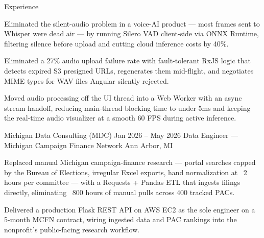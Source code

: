 \documentclass[
	11pt
]{../../../template}
\begin{document}
\begin{rSection}{E}{xperience}
\begin{rSectionEntry}
			\item Eliminated the silent-audio problem in a voice-AI product --- most frames sent to Whisper were dead air --- by running Silero VAD client-side via ONNX Runtime, filtering silence before upload and cutting cloud inference costs by 40\%.
			\item Eliminated a 27\% audio upload failure rate with fault-tolerant RxJS logic that detects expired S3 presigned URLs, regenerates them mid-flight, and negotiates MIME types for WAV files Angular silently rejected.
			\item Moved audio processing off the UI thread into a Web Worker with an async stream handoff, reducing main-thread blocking time to under 5ms and keeping the real-time audio visualizer at a smooth 60 FPS during active inference.
		\end{rSectionEntry}

		\begin{rSectionEntry}
			{Michigan Data Consulting (MDC)}
			{Jan 2026 -- May 2026}
			{Data Engineer --- Michigan Campaign Finance Network}
			{}
			{Ann Arbor, MI}

			\item Replaced manual Michigan campaign-finance research --- portal searches capped by the Bureau of Elections, irregular Excel exports, hand normalization at ~2 hours per committee --- with a Requests + Pandas ETL that ingests filings directly, eliminating ~800 hours of manual pulls across 400 tracked PACs.
			\item Delivered a production Flask REST API on AWS EC2 as the sole engineer on a 5-month MCFN contract, wiring ingested data and PAC rankings into the nonprofit's public-facing research workflow.
		\end{rSectionEntry}
	\end{rSection}
\end{document}
